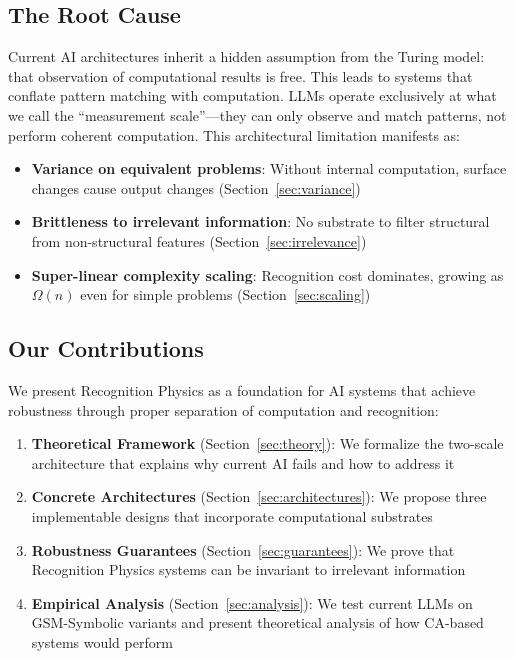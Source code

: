 \documentclass[11pt,letterpaper]{article}
\theoremstyle{plain}
\theoremstyle{definition}
\theoremstyle{remark}
\begin{document}
\subsection{The Root Cause}

Current AI architectures inherit a hidden assumption from the Turing model: that observation of computational results is free. This leads to systems that conflate pattern matching with computation. LLMs operate exclusively at what we call the ``measurement scale''—they can only observe and match patterns, not perform coherent computation. This architectural limitation manifests as:

\begin{itemize}
\item \textbf{Variance on equivalent problems}: Without internal computation, surface changes cause output changes (Section~\ref{sec:variance})
\item \textbf{Brittleness to irrelevant information}: No substrate to filter structural from non-structural features (Section~\ref{sec:irrelevance})
\item \textbf{Super-linear complexity scaling}: Recognition cost dominates, growing as $\Omega(n)$ even for simple problems (Section~\ref{sec:scaling})
\end{itemize}

\subsection{Our Contributions}

We present Recognition Physics as a foundation for AI systems that achieve robustness through proper separation of computation and recognition:

\begin{enumerate}
\item \textbf{Theoretical Framework} (Section~\ref{sec:theory}): We formalize the two-scale architecture that explains why current AI fails and how to address it
\item \textbf{Concrete Architectures} (Section~\ref{sec:architectures}): We propose three implementable designs that incorporate computational substrates
\item \textbf{Robustness Guarantees} (Section~\ref{sec:guarantees}): We prove that Recognition Physics systems can be invariant to irrelevant information
\item \textbf{Empirical Analysis} (Section~\ref{sec:analysis}): We test current LLMs on GSM-Symbolic variants and present theoretical analysis of how CA-based systems would perform
\end{enumerate}
\end{document}
